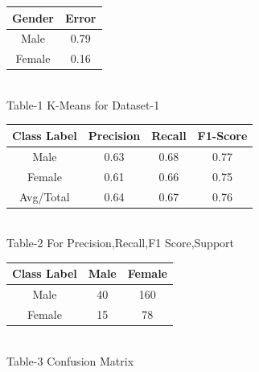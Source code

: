 \documentclass[journal]{IEEEtran}
\begin{document}
		
		\begin{center}
			\begin{tabular}{||c c ||} 
				\hline
				Gender & Error \\ 
				\hline\hline
				Male & 0.79  \\ 
				\hline
				Female & 0.16  \\
			\end{tabular}\\
			\small Table-1 K-Means for Dataset-1
			\vspace{0.5cm}\\
			\begin{tabular}{||c c c c||} 
				\hline
				Class Label & Precision & Recall & F1-Score \\ 
				\hline\hline
				Male & 0.63 & 0.68 & 0.77 \\ 
				\hline
				Female & 0.61 & 0.66 & 0.75 \\ 
				\hline
				Avg/Total & 0.64 & 0.67 & 0.76 \\ 
				
			\end{tabular}\\
			\small Table-2 For Precision,Recall,F1 Score,Support
			\vspace{0.5cm}
			
			\begin{tabular}{||c c c ||} 
				\hline
				Class Label & Male & Female \\ 
				\hline\hline
				Male & 40 & 160  \\ 
				\hline
				Female & 15 & 78  \\
			\end{tabular}\\
			\small Table-3 Confusion Matrix
			
		\end{center}
	
\end{document}
